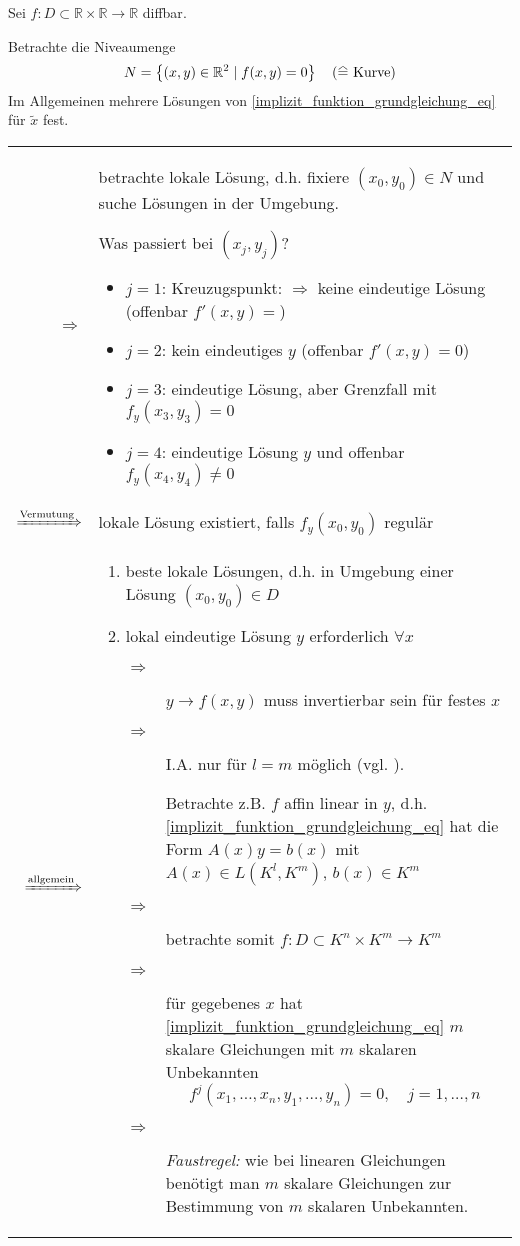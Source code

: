 \begin{example}
	Sei $f:D\subset\mathbb{R}\times\mathbb{R}\to\mathbb{R}$ \gls{diffbar}.
	
	Betrachte die Niveaumenge \begin{align*}
		N= \left\{ (x,y)\in\mathbb{R}^2 \mid f(x,y) = 0 \right\} \quad\text{($\equalhat$ Kurve)}
	\end{align*}
	Im Allgemeinen mehrere Lösungen von \eqref{implizit_funktion_grundgleichung_eq}  für $\tilde{x}$ fest. \\
	\begin{tabularx}{\linewidth}{r@{\ \ }X}
		$\Rightarrow$ & betrachte lokale Lösung, d.h. fixiere $(x_0, y_0)\in N$ und suche Lösungen in der Umgebung.
		
		Was passiert bei $(x_j, y_j)$?\begin{itemize}
			\item $j=1$: Kreuzugspunkt: $\Rightarrow$ keine eindeutige Lösung (offenbar $f'(x,y)=$)
			\item $j=2$: kein eindeutiges $y$ (offenbar $f'(x,y) = 0$)
			\item $j=3$: eindeutige Lösung, aber Grenzfall mit $f_y(x_3, y_3) = 0$
			\item $j=4$: eindeutige Lösung $y$ und offenbar $f_y(x_4, y_4)\neq 0$
		\end{itemize}
		\\
		$\xRightarrow{\text{Vermutung}}$ & lokale Lösung existiert, falls $f_y(x_0, y_0)$ regulär \\
		$\xRightarrow{\text{allgemein}}$ &
		\vspace*{\dimexpr -\baselineskip*2/3}
		\begin{enumerate}[label={\alph*)}]
			\item beste lokale Lösungen, d.h. in Umgebung einer Lösung $(x_0, y_0)\in D$
			\item lokal eindeutige Lösung $y$ erforderlich $\forall x$
			
			\begin{description}
				\item[$\Rightarrow$] $y\to f(x,y)$ muss invertierbar sein für festes $x$ 
				\item[$\Rightarrow$] I.A. nur für $l=m$ möglich (vgl. \propref{implizit_funktion_lemma_3}).
				
				Betrachte z.B. $f$ affin linear in $y$, d.h. \eqref{implizit_funktion_grundgleichung_eq} hat die Form $A(x)y = b(x)$ mit $A(x)\in L(K^l, K^m)$, $b(x)\in K^m$
				\item[$\Rightarrow$] betrachte somit $f:D\subset K^n\times K^m\to K^m$
				\item[$\Rightarrow$] für gegebenes $x$ hat \eqref{implizit_funktion_grundgleichung_eq} $m$ skalare Gleichungen mit $m$ skalaren Unbekannten
				\[f^j(x_1, \dotsc, x_n, y_1, \dotsc, y_n) = 0,\quad j=1,\dotsc,n \]
				\item[$\Rightarrow$] \emph{Faustregel:} wie bei linearen Gleichungen benötigt man $m$ skalare Gleichungen zur Bestimmung von $m$ skalaren Unbekannten.
				

\end{description}
\end{enumerate}
\end{tabularx}
\end{example}
